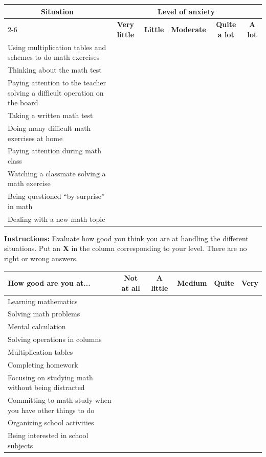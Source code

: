 \noindent
\begin{tabularx}{\textwidth}{|X|c|c|c|c|c|}
\hline
\multicolumn{1}{|c|}{\textbf{Situation}} & \multicolumn{5}{c|}{\textbf{Level of anxiety}} \\
\cline{2-6}
\multicolumn{1}{|c|}{} & \textbf{\scriptsize Very little} & \textbf{\scriptsize Little} & \textbf{\scriptsize Moderate} & \textbf{\scriptsize Quite a lot} & \textbf{\scriptsize A lot} \\
\hline
Using multiplication tables and schemes to do math exercises &   &   &   &   &   \\
\hline
Thinking about the math test &   &   &   &   &   \\
\hline
Paying attention to the teacher solving a difficult operation on the board &   &   &   &   &   \\
\hline
Taking a written math test &   &   &   &   &   \\
\hline
Doing many difficult math exercises at home &   &   &   &   &   \\
\hline
Paying attention during math class &   &   &   &   &   \\
\hline
Watching a classmate solving a math exercise &   &   &   &   &   \\
\hline
Being questioned “by surprise” in math &   &   &   &   &   \\
\hline
Dealing with a new math topic &   &   &   &   &   \\
\hline
\end{tabularx}

\vspace{0.1cm}

\noindent\textbf{Instructions:} Evaluate how good you think you are at handling the different situations. Put an \textbf{X} in the column corresponding to your level. There are no right or wrong answers.
\newline

\noindent
\begin{tabularx}{\textwidth}{|X|c|c|c|c|c|}
  \hline
  \textbf{How good are you at...} & \textbf{\scriptsize Not at all} & \textbf{\scriptsize A little} & \textbf{\scriptsize Medium} & \textbf{\scriptsize Quite} & \textbf{\scriptsize Very} \\
  \hline
  Learning mathematics & & & & & \\
  \hline
  Solving math problems & & & & & \\
  \hline
  Mental calculation & & & & & \\
  \hline
  Solving operations in columns & & & & & \\
  \hline
  Multiplication tables & & & & & \\
  \hline
  Completing homework & & & & & \\
  \hline 
  Focusing on studying math without being distracted & & & & & \\
  \hline
  Committing to math study when you have other things to do & & & & & \\
  \hline
  Organizing school activities & & & & & \\
  \hline
  Being interested in school subjects & & & & & \\
  \hline
\end{tabularx}

